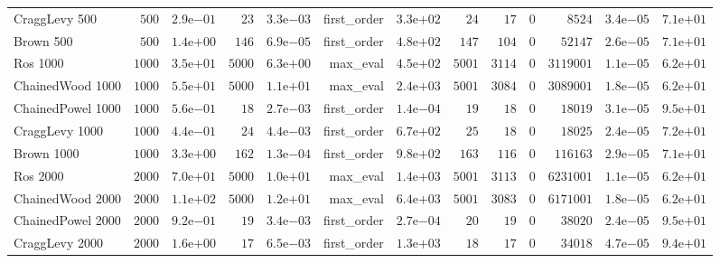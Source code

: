 \begin{longtable}[c]{lrrrrrrrrrrrr}
CraggLevy 500 & \(  500\) & \( 2.9\)e\(-01\) & \(   23\) & \( 3.3\)e\(-03\) & first\_order & \( 3.3\)e\(+02\) & \(   24\) & \(   17\) & \(    0\) & \( 8524\) & \( 3.4\)e\(-05\) & \( 7.1\)e\(+01\) \\
Brown 500 & \(  500\) & \( 1.4\)e\(+00\) & \(  146\) & \( 6.9\)e\(-05\) & first\_order & \( 4.8\)e\(+02\) & \(  147\) & \(  104\) & \(    0\) & \(52147\) & \( 2.6\)e\(-05\) & \( 7.1\)e\(+01\) \\
Ros 1000 & \( 1000\) & \( 3.5\)e\(+01\) & \( 5000\) & \( 6.3\)e\(+00\) & max\_eval & \( 4.5\)e\(+02\) & \( 5001\) & \( 3114\) & \(    0\) & \(3119001\) & \( 1.1\)e\(-05\) & \( 6.2\)e\(+01\) \\
ChainedWood 1000 & \( 1000\) & \( 5.5\)e\(+01\) & \( 5000\) & \( 1.1\)e\(+01\) & max\_eval & \( 2.4\)e\(+03\) & \( 5001\) & \( 3084\) & \(    0\) & \(3089001\) & \( 1.8\)e\(-05\) & \( 6.2\)e\(+01\) \\
ChainedPowel 1000 & \( 1000\) & \( 5.6\)e\(-01\) & \(   18\) & \( 2.7\)e\(-03\) & first\_order & \( 1.4\)e\(-04\) & \(   19\) & \(   18\) & \(    0\) & \(18019\) & \( 3.1\)e\(-05\) & \( 9.5\)e\(+01\) \\
CraggLevy 1000 & \( 1000\) & \( 4.4\)e\(-01\) & \(   24\) & \( 4.4\)e\(-03\) & first\_order & \( 6.7\)e\(+02\) & \(   25\) & \(   18\) & \(    0\) & \(18025\) & \( 2.4\)e\(-05\) & \( 7.2\)e\(+01\) \\
Brown 1000 & \( 1000\) & \( 3.3\)e\(+00\) & \(  162\) & \( 1.3\)e\(-04\) & first\_order & \( 9.8\)e\(+02\) & \(  163\) & \(  116\) & \(    0\) & \(116163\) & \( 2.9\)e\(-05\) & \( 7.1\)e\(+01\) \\
Ros 2000 & \( 2000\) & \( 7.0\)e\(+01\) & \( 5000\) & \( 1.0\)e\(+01\) & max\_eval & \( 1.4\)e\(+03\) & \( 5001\) & \( 3113\) & \(    0\) & \(6231001\) & \( 1.1\)e\(-05\) & \( 6.2\)e\(+01\) \\
ChainedWood 2000 & \( 2000\) & \( 1.1\)e\(+02\) & \( 5000\) & \( 1.2\)e\(+01\) & max\_eval & \( 6.4\)e\(+03\) & \( 5001\) & \( 3083\) & \(    0\) & \(6171001\) & \( 1.8\)e\(-05\) & \( 6.2\)e\(+01\) \\
ChainedPowel 2000 & \( 2000\) & \( 9.2\)e\(-01\) & \(   19\) & \( 3.4\)e\(-03\) & first\_order & \( 2.7\)e\(-04\) & \(   20\) & \(   19\) & \(    0\) & \(38020\) & \( 2.4\)e\(-05\) & \( 9.5\)e\(+01\) \\
CraggLevy 2000 & \( 2000\) & \( 1.6\)e\(+00\) & \(   17\) & \( 6.5\)e\(-03\) & first\_order & \( 1.3\)e\(+03\) & \(   18\) & \(   17\) & \(    0\) & \(34018\) & \( 4.7\)e\(-05\) & \( 9.4\)e\(+01\) \\

\end{longtable}
